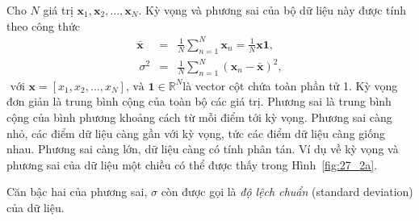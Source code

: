\documentclass[14pt,oneside,a4paper]{report}
\numberwithin{equation}{section}
\begin{document}
Cho $N$ giá trị $\mathbf{x}_1, \mathbf{x}_2, \dots, \mathbf{x}_N$. {Kỳ vọng} và {phương sai}
của bộ dữ liệu này được tính theo công thức
\begin{eqnarray} 
\bar{\mathbf{x}} &=& \frac{1}{N}\sum_{n=1}^N \mathbf{x}_n = \frac{1}{N}\mathbf{x1},\\\ 
\sigma^2 &=& \frac{1}{N} \sum_{n=1}^N (\mathbf{x}_n - \bar{\mathbf{x}})^2,
\end{eqnarray} 
$\text { với } \mathbf{x}=\left[x_1, x_2, \ldots, x_N\right] \text {, và } \mathbf{1} \in \mathbb{R}^N$là
vector cột chứa toàn phần tử 1. Kỳ vọng đơn giản là trung bình cộng của toàn bộ
các giá trị. Phương sai là trung bình cộng của bình phương khoảng cách từ mỗi
điểm tới kỳ vọng. Phương sai càng nhỏ, các điểm dữ liệu càng gần với kỳ vọng,
tức các điểm dữ liệu càng giống nhau. Phương sai càng lớn, dữ liệu càng có tính
phân tán. Ví dụ về kỳ vọng và phương sai của dữ liệu một chiều có thể được thấy
trong Hình~\ref{fig:27_2a}. 

Căn bậc hai của phương sai, $\sigma$ còn được gọi là \textit{độ lệch chuẩn} (standard deviation) của
dữ liệu.
\end{document}
